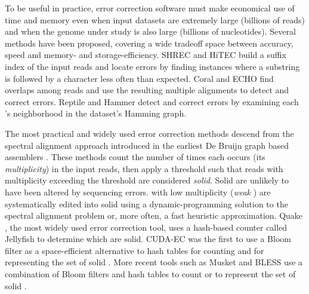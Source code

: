 \documentclass[10pt]{article}
\begin{document}
To be useful in practice, error correction software must make economical use of time and memory even when input datasets are extremely large (billions of reads) and when the genome under study is also large (billions of nucleotides).
Several methods have been proposed, covering a wide tradeoff space between accuracy, speed and memory- and storage-efficiency.
SHREC \cite{schroder2009shrec} and HiTEC \cite{ilie2011hitec} build a suffix index of the input reads and locate errors by finding instances where a substring is followed by a character less often than expected.
Coral \cite{salmela2011correcting} and ECHO \cite{kao2011echo} find overlaps among reads and use the resulting multiple alignments to detect and correct errors.
Reptile \cite{yang2010reptile} and Hammer \cite{medvedev2011error} detect and correct errors by examining each \kmer's neighborhood in the dataset's \kmer Hamming graph.


The most practical and widely used error correction methods descend from the spectral alignment approach introduced in the earliest De Bruijn graph based assemblers \cite{pevzner2001eulerian, chaisson2004fragment}.
These methods count the number of times each \kmer occurs (its \emph{multiplicity}) in the input reads, then apply a threshold such that reads with multiplicity exceeding the threshold are considered \emph{solid}.
Solid \kmers are unlikely to have been altered by sequencing errors.
\kmers with low multiplicity (\emph{weak} \kmers) are systematically edited into solid \kmers using a dynamic-programming solution to the spectral alignment problem \cite{pevzner2001eulerian, chaisson2004fragment} or, more often, a fast heuristic approximation.
Quake \cite{kelley2010quake}, the most widely used error correction tool, uses a hash-based \kmer counter called Jellyfish \cite{marccais2011fast} to determine which \kmers are solid.
CUDA-EC \cite{shi2010parallel} was the first to use a Bloom filter as a space-efficient alternative to hash tables for counting \kmers and for representing the set of solid \kmers.
More recent tools such as Musket \cite{liu2013musket} and BLESS \cite{heo2014bless} use a combination of Bloom filters and hash tables to count \kmers or to represent the set of solid \kmers.
\end{document}
